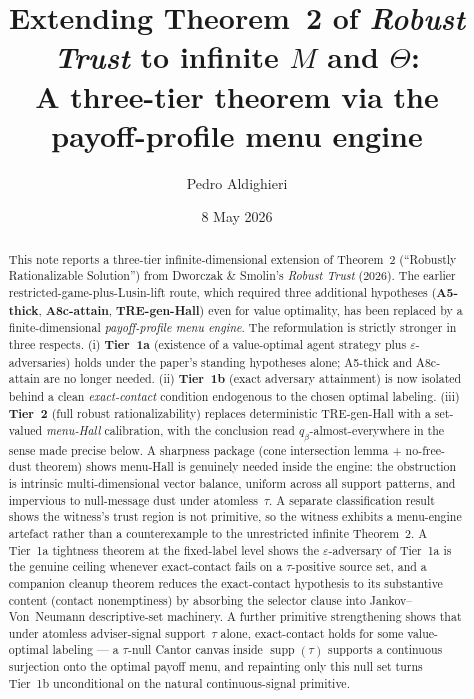 \documentclass[11pt]{article}
\title{
  Extending Theorem~2 of \emph{Robust Trust} to infinite $M$ and $\Theta$:\\
  \large A three-tier theorem via the payoff-profile menu engine
}
\author{Pedro Aldighieri}
\date{8 May 2026}
\theoremstyle{definition}
\theoremstyle{remark}
\newcommand{\eps}{\varepsilon}
\newcommand{\suppset}{\operatorname{supp}}
\begin{document}
\maketitle

\begin{abstract}
This note reports a three-tier infinite-dimensional extension of
Theorem~2 (``Robustly Rationalizable Solution'') from Dworczak \&
Smolin's \emph{Robust Trust} (2026). The earlier
restricted-game-plus-Lusin-lift route, which required three
additional hypotheses (\textbf{A5-thick}, \textbf{A8c-attain},
\textbf{TRE-gen-Hall}) even for value optimality, has been replaced
by a finite-dimensional \emph{payoff-profile menu engine}. The
reformulation is strictly stronger in three respects. (i)
\textbf{Tier~1a} (existence of a value-optimal agent strategy plus
$\eps$-adversaries) holds under the paper's standing hypotheses
alone; A5-thick and A8c-attain are no longer needed. (ii)
\textbf{Tier~1b} (exact adversary attainment) is now isolated behind
a clean \emph{exact-contact} condition endogenous to the chosen
optimal labeling. (iii) \textbf{Tier~2} (full robust
rationalizability) replaces deterministic TRE-gen-Hall with a
set-valued \emph{menu-Hall} calibration, with the conclusion read
$q_\beta$-almost-everywhere in the sense made precise below. A
sharpness package (cone intersection lemma + no-free-dust theorem)
shows menu-Hall is genuinely needed inside the engine: the
obstruction is intrinsic multi-dimensional vector balance, uniform
across all support patterns, and impervious to null-message dust
under atomless~$\tau$. A separate classification result shows the
witness's trust region is not primitive, so the witness exhibits a
menu-engine artefact rather than a counterexample to the unrestricted
infinite Theorem~2. A Tier~1a tightness theorem at the fixed-label
level shows the $\eps$-adversary of Tier~1a is the genuine ceiling
whenever exact-contact fails on a $\tau$-positive source set, and a
companion cleanup theorem reduces the exact-contact hypothesis to
its substantive content (contact nonemptiness) by absorbing the
selector clause into Jankov--Von~Neumann descriptive-set machinery.
A further primitive strengthening shows that under atomless
adviser-signal support~$\tau$ alone, exact-contact holds for some
value-optimal labeling --- a $\tau$-null Cantor canvas inside
$\suppset(\tau)$ supports a continuous surjection onto the optimal
payoff menu, and repainting only this null set turns Tier~1b
unconditional on the natural continuous-signal primitive.
\end{abstract}
\end{document}
